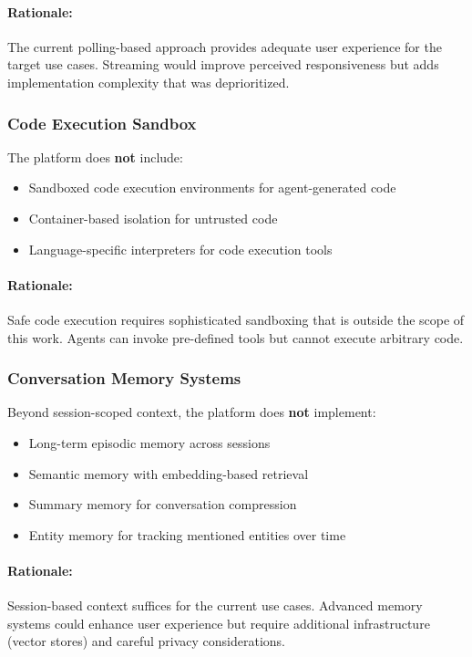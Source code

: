 \documentclass[a4paper,twoside]{sapthesis}
\begin{document}
\paragraph{Rationale:} The current polling-based approach provides adequate user experience for the target use cases. Streaming would improve perceived responsiveness but adds implementation complexity that was deprioritized.

\subsubsection{Code Execution Sandbox}

The platform does \textbf{not} include:

\begin{itemize}
    \item Sandboxed code execution environments for agent-generated code
    \item Container-based isolation for untrusted code
    \item Language-specific interpreters for code execution tools
\end{itemize}

\paragraph{Rationale:} Safe code execution requires sophisticated sandboxing that is outside the scope of this work. Agents can invoke pre-defined tools but cannot execute arbitrary code.

\subsubsection{Conversation Memory Systems}

Beyond session-scoped context, the platform does \textbf{not} implement:

\begin{itemize}
    \item Long-term episodic memory across sessions
    \item Semantic memory with embedding-based retrieval
    \item Summary memory for conversation compression
    \item Entity memory for tracking mentioned entities over time
\end{itemize}

\paragraph{Rationale:} Session-based context suffices for the current use cases. Advanced memory systems could enhance user experience but require additional infrastructure (vector stores) and careful privacy considerations.
\end{document}
